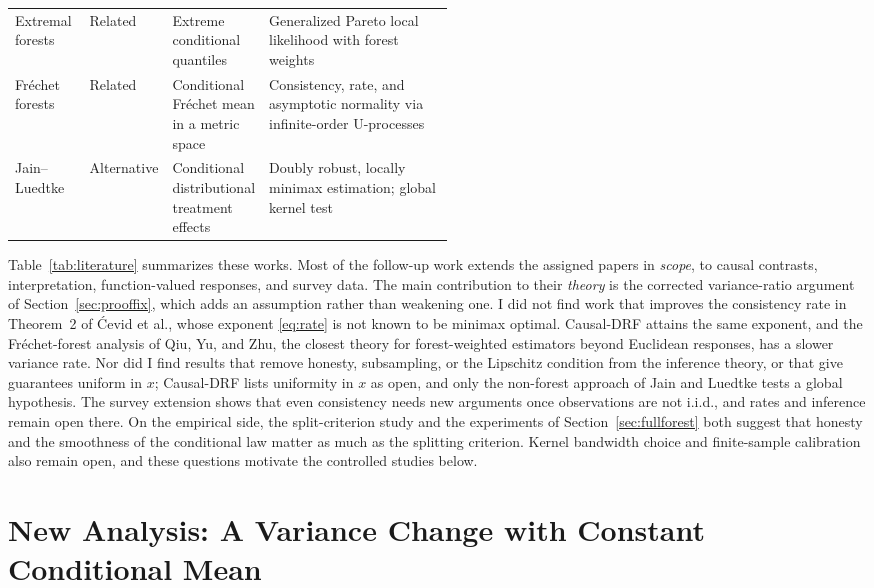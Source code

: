 \documentclass[12pt,a4paper]{article}
\newcommand{\1}{\mathbf 1}
\begin{document}
\begin{table}[htbp]
\begin{tabularx}{\linewidth}{@{}>{\raggedright\arraybackslash}p{0.17\linewidth}>{\raggedright\arraybackslash}p{0.13\linewidth}>{\raggedright\arraybackslash}p{0.21\linewidth}Y@{}}
\midrule
Extremal forests \cite{gnecco2024} & Related & Extreme conditional quantiles & Generalized Pareto local likelihood with forest weights\\
Fr\'echet forests \cite{qiu2024} & Related & Conditional Fr\'echet mean in a metric space & Consistency, rate, and asymptotic normality via infinite-order U-processes\\
Jain--Luedtke \cite{jainluedtke2026} & Alternative & Conditional distributional treatment effects & Doubly robust, locally minimax estimation; global kernel test\\
\bottomrule
\end{tabularx}
\end{table}

Table~\ref{tab:literature} summarizes these works. Most of the follow-up work extends the assigned papers in \emph{scope}, to causal contrasts, interpretation, function-valued responses, and survey data. The main contribution to their \emph{theory} is the corrected variance-ratio argument of Section~\ref{sec:prooffix}, which adds an assumption rather than weakening one. I did not find work that improves the consistency rate in Theorem~2 of \'{C}evid et al., whose exponent \eqref{eq:rate} is not known to be minimax optimal. Causal-DRF attains the same exponent, and the Fr\'echet-forest analysis of Qiu, Yu, and Zhu, the closest theory for forest-weighted estimators beyond Euclidean responses, has a slower variance rate. Nor did I find results that remove honesty, subsampling, or the Lipschitz condition from the inference theory, or that give guarantees uniform in $x$; Causal-DRF lists uniformity in $x$ as open, and only the non-forest approach of Jain and Luedtke tests a global hypothesis. The survey extension shows that even consistency needs new arguments once observations are not i.i.d., and rates and inference remain open there. On the empirical side, the split-criterion study and the experiments of Section~\ref{sec:fullforest} both suggest that honesty and the smoothness of the conditional law matter as much as the splitting criterion. Kernel bandwidth choice and finite-sample calibration also remain open, and these questions motivate the controlled studies below.

\section{New Analysis: A Variance Change with Constant Conditional Mean}\label{sec:original}
\end{document}
